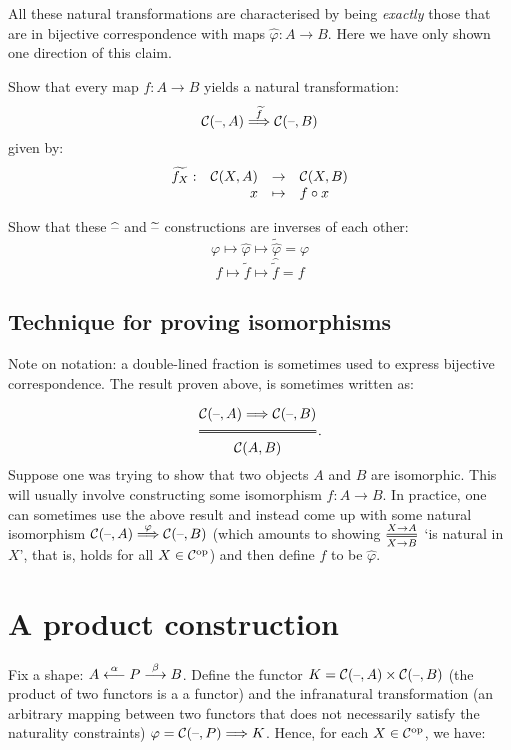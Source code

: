 All these natural transformations are characterised by being \textit{exactly}
those that are in bijective correspondence with maps
$\widehat{\varphi}: A \to B$. Here we have only shown one direction of this
claim.

\begin{exercise}
Show that every map $f: A \to B$ yields a natural transformation:
\[ \mathcal{C} (\text{--}, A) \overset{\widetilde{f}}{\Longrightarrow} \mathcal{C} (\text{--}, B) \]
given by:
\[ \begin{array}{crcl}
    \widetilde{f_X}: & \mathcal{C} (X, A) & \to & \mathcal{C} (X, B) \\
    & x & \mapsto & f \circ x
\end{array} \]
\end{exercise}

\begin{exercise}
Show that these $\widehat{\text{--}}$ and $\widetilde{\text{--}}$ constructions are
inverses of each other:
\[ \varphi \mapsto \widehat{\varphi} \mapsto \widetilde{\widehat{\varphi}} =
\varphi \]
\[ f \mapsto \widetilde{f} \mapsto \widehat{\widetilde{f}} = f \]
\end{exercise}

\subsection{Technique for proving isomorphisms}\label{subsec:proveiso}

Note on notation: a double-lined fraction is sometimes used to express
bijective correspondence. The result proven above, is sometimes written as:

\[ \Efrac{\lscat C (\phold, A) \natarrow \lscat C (\phold, B) }{ \lscat C(A, B) }.\]

Suppose one was trying to show that two objects $A$ and $B$ are isomorphic.
This will usually involve constructing some isomorphism $ f : A \to B $.  In
practice, one can sometimes use the above result and instead come up with some
natural isomorphism $\mathcal{C} (\text{--}, A) \overset{\varphi}{\Longrightarrow} \mathcal{C} (\text{--},
B)$ (which amounts to showing $ \Efrac{X \to A}{X \to B} $ `is natural in $X$',
that is, holds for all $X \in \mathcal{C}^{\mathrm{op}} $) and then define $f$ to be
$\widehat{\varphi}$.

\section{A product construction}

Fix a shape: $ A \overset{\alpha}{\longleftarrow} P \overset{\beta}{\longrightarrow} B $. 
Define the functor $ K = \mathcal{C} (\text{--}, A) \times \mathcal{C}
(\text{--}, B)$ (the product of two functors is a a functor) and the infranatural
transformation (an arbitrary mapping between two functors that does not
necessarily satisfy the naturality constraints) $\varphi = \mathcal{C} (\text{--}, P)
\Longrightarrow K $. Hence, for each $X
\in \mathcal{C}^{\mathrm{op}} $, we have: 

